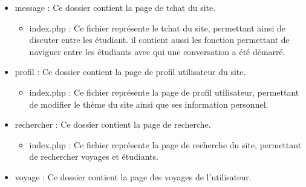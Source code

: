 \documentclass[a4paper,10pt]{report}
\begin{document}
\begin{itemize}
\begin{itemize}
\begin{itemize}
            \item update.php : Ce fichier contient toutes les fonction permetant de modifier des \'el\'ements de la base de donn\'ee.
        \end{itemize}
        \item bibli.php : Ce fichier contient toutes les fonction un peu à part du programme.
        \item deco.php : Ce fichier permet de renvoyer à la page de connexion tout utilisateur n'\'etant pas connecter.
        \item html.php : Ce fichier contient toutes les fonction aillant pour but de g\'en\'erer de l'html.
        \item securiter.php : Ce fichier contient des s\'ecurit\'e vis à vis des attaque par injection SQL.
        \item sql.php : Ce fichier permet d'inclure en une fois toutes les biblioth\`eque SQL et fournit une fonction permettant de
        r\'ecup\'erer un objet PDO de mani\`ere propre.
    \end{itemize}
    \item message : Ce dossier contient la page de tchat du site.
    \begin{itemize}
        \item index.php : Ce fichier repr\'esente le tchat du site, permettant ainsi de discuter entre les \'etudiant. il contient aussi les fonction permettant de naviguer entre les \'etudiants avec
        qui une conversation a \'et\'e d\'emarr\'e.
    \end{itemize}
    \item profil : Ce dossier contient la page de profil utilisateur du site.
    \begin{itemize}
         \item index.php : Ce fichier repr\'esente la page de profil utilisateur, permettant de modifier le th\`eme du site ainsi que ses information personnel.
    \end{itemize}
    \item rechercher : Ce dossier contient la page de recherche.
    \begin{itemize}
        \item index.php : Ce fichier repr\'esente la page de recherche du site, permettant de rechercher voyages et \'etudiants.
    \end{itemize}
    \item voyage : Ce dossier contient la page des voyages de l'utilisateur.
    \begin{itemize}

\end{itemize}
\end{itemize}
\end{document}
